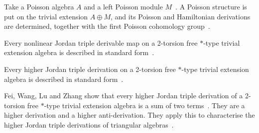 Take a Poisson algebra $A$ and a left Poisson module $M$~\cite{WlPoissonDerivationsAnd2019}. A Poisson structure
is
put on the trivial extension $A \oplus M$, and its Poisson and Hamiltonian
derivations are determined, together with the first Poisson cohomology
group~\cite{WlPoissonDerivationsAnd2019}.

Every nonlinear Jordan triple derivable map on a 2-torsion free $*$-type
trivial extension algebra is described in standard
form~\cite{WlNonlinearJordanTriple2024}.

Every higher Jordan triple derivation on a 2-torsion free $*$-type trivial
extension algebra is described in standard
form~\cite{WlHigherJordanTriple2024}.

Fei, Wang, Lu and Zhang show that every higher Jordan triple derivation of a
2-torsion free $*$-type trivial extension algebra is a sum of two terms~\cite{WlHigherJordanTripleDerivationsO2024}. They
are a higher
derivation and a higher anti-derivation. They apply this to characterise the
higher Jordan triple derivations of triangular
algebras~\cite{WlHigherJordanTripleDerivationsO2024}.
